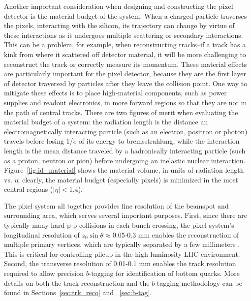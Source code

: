 Another important consideration when designing and constructing the pixel detector is the material budget of the system.  When a 
charged particle traverses the pixels, interacting with the silicon, its trajectory can change by virtue of these interactions 
as it undergoes multiple scattering or secondary interactions.  This can be a problem, for example, when reconstructing 
tracks--if a track has a kink from where it scattered off detector material, it will be more 
challenging to reconstruct the track or correctly measure its momentum.  These material effects are particularly important for the pixel 
detector, because they are the first layer of detector traversed by particles after they leave the collision point.  
One way to mitigate these effects is to place high-material components, such as power supplies and readout 
electronics, in more forward regions so that they are not in the path of central tracks.  There are 
two figures of merit when evaluating the material budget of a system: the radiation length is the distance an 
electromagnetically interacting particle (such as an electron, positron or photon) travels before losing 1/$e$ 
of its energy to bremsstrahlung, while the interaction length is the mean distance traveled by a hadronically interacting 
particle (such as a proton, neutron or pion) before undergoing an inelastic nuclear interaction.  Figure~\ref{fig:id_material} 
shows the material volume, in units of radiation length vs. $\eta$; clearly, the material budget 
(especially pixels) is minimized in the most central regions ($|\eta|<$1.4).


The pixel system all together provides fine resolution of the beamspot and surrounding area, 
which serves several important purposes.  First, since there are typically many hard 
p-p collisions in each bunch crossing, the pixel 
system's longitudinal resolution of $z_0\sin\theta\approx$0.05-0.3 mm 
enables the reconstruction of multiple primary vertices, which are typically separated by a few millimeters \cite{pixel_res}.  This 
is critical for controlling pileup in the high-luminosity LHC environment.  Second, the transverse resolution of 0.01-0.1 mm 
enables the track resolution required to allow precision $b$-tagging for identification of bottom quarks.  More details
on both the track reconstruction and the $b$-tagging methodology can be found in Sections~\ref{sec:trk_reco} and ~\ref{sec:b-tag}. 


